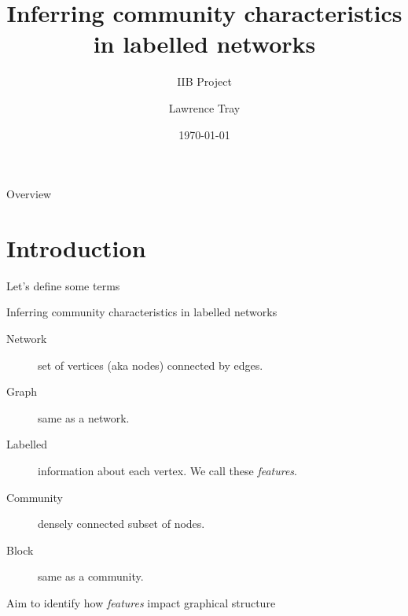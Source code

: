 \documentclass{beamer}
\title{Inferring community characteristics in labelled networks}
\subtitle{IIB Project}
\author{Lawrence Tray}
\institute{Ioannis Kontoyiannis}
\date{\today}
\begin{document}
	
	\begin{frame}
		\titlepage
	\end{frame}

	\begin{frame}{Overview}
		\tableofcontents
	\end{frame}

\section{Introduction}
	
	\begin{frame}{Let's define some terms}
		\begin{block}{Inferring community characteristics in labelled networks}
			\begin{description}
				\item[Network] set of vertices (aka nodes) connected by edges.
				\item[Graph] same as a network.
				\item[Labelled] information about each vertex. We call these {\em features}.
				\item[Community] densely connected subset of nodes.
				\item[Block] same as a community.
			\end{description}
		\end{block}
		\centering
		\vspace{1cm}
		Aim to identify how {\em features} impact graphical structure
	\end{frame}
	
\end{document}
